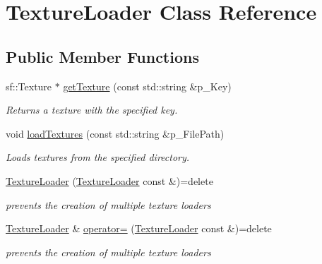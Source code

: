 \hypertarget{class_texture_loader}{}\section{Texture\+Loader Class Reference}
\label{class_texture_loader}
\subsection*{Public Member Functions}
\begin{DoxyCompactItemize}
\item 
\mbox{\label{class_texture_loader_ad0e763368d9e1ce26b25819113685b28}} 
sf\+::\+Texture $\ast$ \hyperlink{class_texture_loader_ad0e763368d9e1ce26b25819113685b28}{get\+Texture} (const std\+::string \&p\+\_\+\+Key)
\begin{DoxyCompactList}\small\item\em Returns a texture with the specified key. \end{DoxyCompactList}\item 
\mbox{\label{class_texture_loader_a7e9ef47fb129ac6accf99ec1548c3f6a}} 
void \hyperlink{class_texture_loader_a7e9ef47fb129ac6accf99ec1548c3f6a}{load\+Textures} (const std\+::string \&p\+\_\+\+File\+Path)
\begin{DoxyCompactList}\small\item\em Loads textures from the specified directory. \end{DoxyCompactList}\item 
\mbox{\label{class_texture_loader_a8e89f35e81bf1cfdd739d91ec0f00831}} 
\hyperlink{class_texture_loader_a8e89f35e81bf1cfdd739d91ec0f00831}{Texture\+Loader} (\hyperlink{class_texture_loader}{Texture\+Loader} const \&)=delete
\begin{DoxyCompactList}\small\item\em prevents the creation of multiple texture loaders \end{DoxyCompactList}\item 
\mbox{\label{class_texture_loader_a137de3f6a2f013406d5dcf76d7d4b901}} 
\hyperlink{class_texture_loader}{Texture\+Loader} \& \hyperlink{class_texture_loader_a137de3f6a2f013406d5dcf76d7d4b901}{operator=} (\hyperlink{class_texture_loader}{Texture\+Loader} const \&)=delete
\begin{DoxyCompactList}\small\item\em prevents the creation of multiple texture loaders \end{DoxyCompactList}\end{DoxyCompactItemize}
